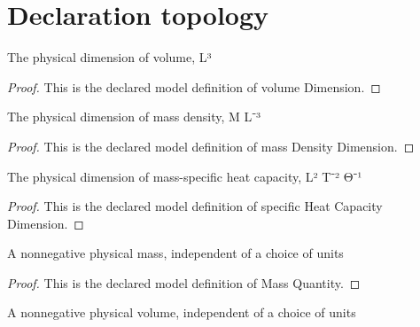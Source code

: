 \section{Declaration topology}
\begin{definition}
  \label{def:physics:phyx-mini-0485:phyxminiproblems-problemphyxmini0485-volumedimension}
  The physical dimension of volume, L³
\end{definition}
\begin{proof}
  This is the declared model definition of volume Dimension.
\end{proof}
\begin{definition}
  \label{def:physics:phyx-mini-0485:phyxminiproblems-problemphyxmini0485-massdensitydimension}
  The physical dimension of mass density, M L⁻³
\end{definition}
\begin{proof}
  This is the declared model definition of mass Density Dimension.
\end{proof}
\begin{definition}
  \label{def:physics:phyx-mini-0485:phyxminiproblems-problemphyxmini0485-specificheatcapacitydimension}
  The physical dimension of mass-specific heat capacity, L² T⁻² Θ⁻¹
\end{definition}
\begin{proof}
  This is the declared model definition of specific Heat Capacity Dimension.
\end{proof}
\begin{definition}
  \label{def:physics:phyx-mini-0485:phyxminiproblems-problemphyxmini0485-massquantity}
  A nonnegative physical mass, independent of a choice of units
\end{definition}
\begin{proof}
  This is the declared model definition of Mass Quantity.
\end{proof}
\begin{definition}
  \label{def:physics:phyx-mini-0485:phyxminiproblems-problemphyxmini0485-volumequantity}
  A nonnegative physical volume, independent of a choice of units
\end{definition}
